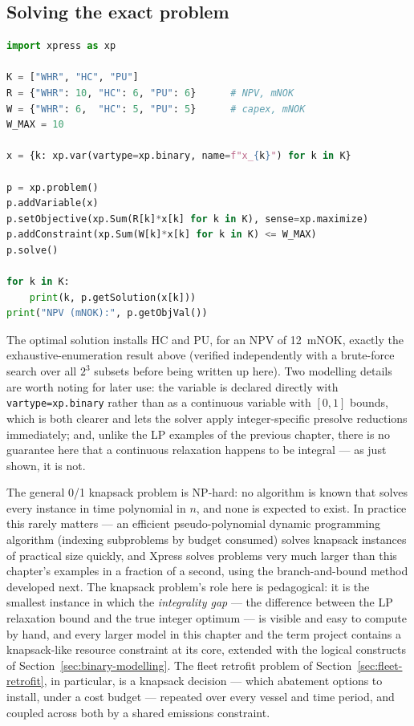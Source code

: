 \subsection{Solving the exact problem}

\begin{lstlisting}[language=Python]
import xpress as xp

K = ["WHR", "HC", "PU"]
R = {"WHR": 10, "HC": 6, "PU": 6}      # NPV, mNOK
W = {"WHR": 6,  "HC": 5, "PU": 5}      # capex, mNOK
W_MAX = 10

x = {k: xp.var(vartype=xp.binary, name=f"x_{k}") for k in K}

p = xp.problem()
p.addVariable(x)
p.setObjective(xp.Sum(R[k]*x[k] for k in K), sense=xp.maximize)
p.addConstraint(xp.Sum(W[k]*x[k] for k in K) <= W_MAX)
p.solve()

for k in K:
    print(k, p.getSolution(x[k]))
print("NPV (mNOK):", p.getObjVal())
\end{lstlisting}

The optimal solution installs HC and PU, for an NPV of 12~mNOK, exactly
the exhaustive-enumeration result above (verified independently with a
brute-force search over all $2^3$ subsets before being written up here).
Two modelling details are worth noting for later use: the variable is
declared directly with \texttt{vartype=xp.binary} rather than as a
continuous variable with $[0,1]$ bounds, which is both clearer and lets
the solver apply integer-specific presolve reductions immediately; and,
unlike the LP examples of the previous chapter, there is no guarantee
here that a continuous relaxation happens to be integral --- as just
shown, it is not.

The general 0/1 knapsack problem is NP-hard: no algorithm is known that
solves every instance in time polynomial in $n$, and none is expected to
exist. In practice this rarely matters --- an efficient pseudo-polynomial
dynamic programming algorithm (indexing subproblems by budget consumed)
solves knapsack instances of practical size quickly, and Xpress solves
problems very much larger than this chapter's examples in a fraction of a
second, using the branch-and-bound method developed next. The knapsack
problem's role here is pedagogical: it is the smallest instance in which
the \emph{integrality gap} --- the difference between the LP relaxation
bound and the true integer optimum --- is visible and easy to compute by
hand, and every larger model in this chapter and the term project
contains a knapsack-like resource constraint at its core, extended with
the logical constructs of Section~\ref{sec:binary-modelling}. The fleet
retrofit problem of Section~\ref{sec:fleet-retrofit}, in particular, is a
knapsack decision --- which abatement options to install, under a cost
budget --- repeated over every vessel and time period, and coupled across
both by a shared emissions constraint.

